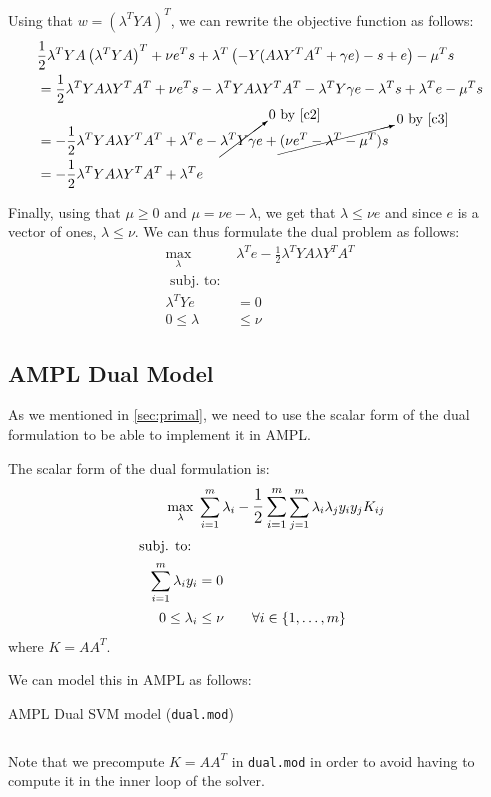 Using that $w = \left(\lambda^T YA\right)^T$, we can
rewrite the objective function as follows:
\begin{align*}
    & \frac{1}{2}
    \lambda^T YA \left(\lambda^T YA\right)^T
    + \nu e^T s
    + \lambda^T \left(-Y(A\lambda Y^T A^T + \gamma e) - s + e\right)
    - \mu^T s
    \\
    &= \frac{1}{2}
    \lambda^T YA \lambda Y^T A^T
    + \nu e^T s
    - \lambda^T Y A \lambda Y^T A^T
    - \lambda^T Y \gamma e
    -\lambda^T s
    +\lambda^T e
    - \mu^T s \\
    &= - \frac{1}{2}
    \lambda^T Y A \lambda Y^T A^T
    + \lambda^T e
    - \cancelto{0 \text{ by }\ref{c2}}{\lambda^T Y \gamma e \vphantom{\frac{1}{2}}}
    + \cancelto{0 \text{ by }\ref{c3}}{(\nu e^T
       - \lambda^T 
   - \mu^T) s}
    \\
    &= - \frac{1}{2}
    \lambda^T Y A \lambda Y^T A^T
    + \lambda^T e
\end{align*}

Finally, using that $\mu \geq 0$ and $\mu = \nu e - \lambda$,
we get that $\lambda \leq \nu e$ and since $e$ is a vector of ones,
$\lambda \leq \nu$. We can thus formulate the dual problem as follows:
\begin{align*}
    \max_{\lambda}\; & \lambda^T e - \frac{1}{2} \lambda^T Y A \lambda Y^T A^T
    \\
    \text{ subj. to: } \\
    \lambda^T Y e & = 0 \\
    0 \leq \lambda & \leq \nu
\end{align*}


\pagebreak
\subsection{AMPL Dual Model}

As we mentioned in \cref{sec:primal}, we need to use
the scalar form of the dual formulation to be able to
implement it in AMPL.

The scalar form of the dual formulation is:
\begin{align*}
    \max_{\lambda}\; & \sum_{i=1}^m \lambda_i - 
    \mathlarger{\frac{1}{2}
    \sum_{i=1}^m}
    \sum_{j=1}^m \lambda_i \lambda_j y_i y_j K_{ij}
    \\
    \text{ subj. to: } \\
    \sum_{i=1}^m \lambda_i y_i & = 0 \\
    0 \leq \lambda_i & \leq \nu \qquad \forall i \in \{1,\ldots,m\}
\end{align*}
where $K = AA^T$.

We can model this in AMPL as follows:
\begin{listing}[H]
    \caption{AMPL Dual SVM model (\texttt{dual.mod})}
    \inputminted{ampl}{../ampl/dual.mod}
\end{listing}
Note that we precompute $K = AA^T$ in \texttt{dual.mod} 
in order to avoid having to compute it in the inner loop
of the solver.
